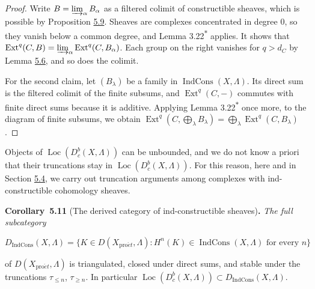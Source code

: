 \documentclass[11pt]{article}
\newenvironment{bpstatement}[2]{\par\addvspace{0.6\baselineskip}\noindent\textbf{#1}#2\textbf{.}\enspace\ignorespaces}
  {\par\addvspace{0.4\baselineskip}}
\newenvironment{bpstatementit}[2]{\begin{bpstatement}{#1}{#2}\itshape\ignorespaces}{\end{bpstatement}}
\newcommand{\bpout}[1]{#1\textsuperscript{\hyperlink{bp-outside}{\ensuremath{\ast}}}}
\providecommand{\Dbc}{}\renewcommand{\Dbc}{D^b_c}
\providecommand{\Dic}{}\renewcommand{\Dic}{D_{\IndCons}}
\providecommand{\Ext}{}\renewcommand{\Ext}{\operatorname{Ext}}
\providecommand{\IndCons}{}\renewcommand{\IndCons}{\operatorname{IndCons}}
\providecommand{\Loc}{}\renewcommand{\Loc}{\operatorname{Loc}}
\begin{document}
\begin{proof}[{Proof}]\label{bp31}%
Write \(B=\varinjlim_\alpha B_\alpha\) as a filtered colimit of constructible sheaves, which is possible by Proposition \hyperref[bp27]{5.9}. Sheaves are complexes concentrated in degree \(0\), so they vanish below a common degree, and Lemma \bpout{3.22} applies. It shows that \(\Ext^q(C,B)=\varinjlim_\alpha\Ext^q(C,B_\alpha)\). Each group on the right vanishes for \(q>d_C\) by Lemma \hyperref[bp20]{5.6}, and so does the colimit.

For the second claim, let \((B_\lambda)\) be a family in \(\IndCons(X,\Lambda)\). Its direct sum is the filtered colimit of the finite subsums, and \(\Ext^q(C,-)\) commutes with finite direct sums because it is additive. Applying Lemma \bpout{3.22} once more, to the diagram of finite subsums, we obtain \(\Ext^q(C,\bigoplus_\lambda B_\lambda)=\bigoplus_\lambda\Ext^q(C,B_\lambda)\).
\end{proof}

\label{bp32}%
Objects of \(\Loc(\Dbc(X,\Lambda))\) can be unbounded, and we do not know a priori that their truncations stay in \(\Loc(\Dbc(X,\Lambda))\). For this reason, here and in Section \hyperref[bp53]{5.4}, we carry out truncation arguments among complexes with ind-constructible cohomology sheaves.

\label{bp33}%
\begin{bpstatementit}{Corollary~5.11}{ (The derived category of ind-constructible sheaves)}
The full subcategory

\[
\Dic(X,\Lambda)
=\{K\in D(X_{\mathrm{pro}\acute{e}t},\Lambda):H^n(K)\in\IndCons(X,\Lambda)\text{ for every }n\}
\]

of \(D(X_{\mathrm{pro}\acute{e}t},\Lambda)\) is triangulated, closed under direct sums, and stable under the truncations \(\tau_{\leq n}\), \(\tau_{\geq n}\). In particular \(\Loc(\Dbc(X,\Lambda))\subset\Dic(X,\Lambda)\).
\end{bpstatementit}
\end{document}
